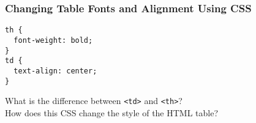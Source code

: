 \documentclass[14pt,aspectratio=169]{beamer}
\begin{document}
%
\begin{frame}[fragile]
  \frametitle{Changing Table Fonts and Alignment Using CSS}
  \normalsize
  \hspace*{.25in}
  \begin{minipage}{6in}
    \vspace*{.2in}
    \begin{verbatim}
th {
  font-weight: bold;
}
td {
  text-align: center;
}
    \end{verbatim}
  \end{minipage}
  \vspace*{.05in}
  \begin{center}
    \noindent What is the difference between {\tt <td>} and {\tt <th>}?\\
    \noindent How does this CSS change the style of the HTML table?\\
  \end{center}
\end{frame}
\end{document}
